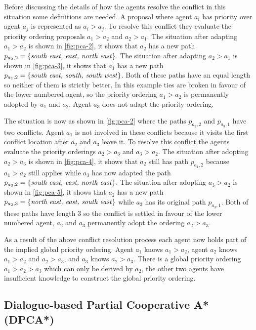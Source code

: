 Before discussing the details of how the agents resolve the conflict in this
situation some definitions are needed. A proposal where agent $a_i$ has
priority over agent $a_j$ is represented as $a_i > a_j$. To resolve this 
conflict they evaluate the priority ordering proposals 
$a_1 > a_2$ and $a_2 > a_1$. The situation after adapting $a_1 > a_2$ is shown 
in \autoref{fig:pca-2}, it shows that $a_2$ has a new path $p_{a_2,2} = 
\{\text{\emph{south east, east, north east}}\}$. The situation after adapting 
$a_2 > a_1$ is shown in \autoref{fig:pca-3}, it shows that $a_1$ has a new path 
$p_{a_1,2} = \{\text{\emph{south east, south, south west}}\}$. Both of these 
paths have an equal length so neither of them is strictly better. In this 
example ties are broken in favour of the lower numbered agent, so the priority 
ordering $a_1 > a_2$ is permanently adopted by $a_1$ and $a_2$. Agent $a_3$ 
does not adapt the priority ordering.

The situation is now as shown in \autoref{fig:pca-2} where the paths 
$p_{a_2,2}$ 
and $p_{a_3,1}$ have two conflicts. Agent $a_1$ is not involved in these 
conflicts because it visits the first conflict location after $a_2$ and $a_3$ 
leave it. To resolve this conflict the agents evaluate the priority orderings 
$a_2 > a_3$ and $a_3 > a_2$. The situation after adopting $a_2 > a_3$ is shown 
in \autoref{fig:pca-4}, it shows that $a_2$ still has path $p_{a_1,2}$ because 
$a_1 > a_2$ still applies while $a_3$ has now adapted the path 
$p_{a_3,2} = \{\text{\emph{south east, east, north east}}\}$. The situation 
after adopting $a_3 > a_2$ is shown in \autoref{fig:pca-5}, it shows that $a_2$ 
has a new path $p_{a_2,3} = \{\text{\emph{north east, east, south east}}\}$ 
while $a_3$ has its original path $p_{a_3,1}$. Both of these paths have length 
3 so the conflict is settled in favour of the lower numbered agent, $a_2$ and 
$a_3$ permanently adopt the ordering $a_2 > a_3$.

As a result of the above conflict resolution process each agent now holds part 
of the implied global priority ordering. Agent $a_1$ knows $a_1 > a_2$, agent 
$a_2$ knows $a_1 > a_2$ and $a_2 > a_3$, and $a_3$ knows $a_2 > a_3$. There is 
a global priority ordering $a_1 > a_2 > a_3$ which can only be derived by 
$a_2$, the other two agents have insufficient knowledge to construct the global 
priority ordering.

\subsection{Dialogue-based Partial Cooperative A* (DPCA*)}

